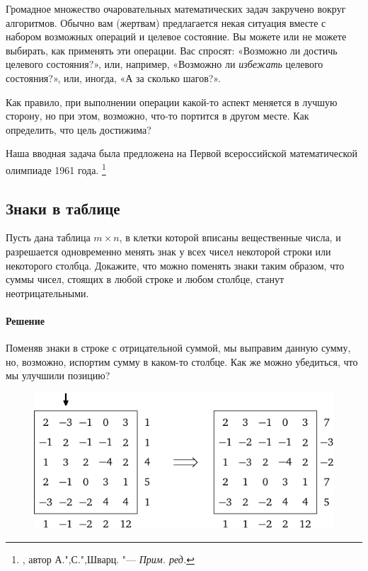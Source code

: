 \documentclass[twoside]{book}
\makeatletter
\newcommand{\rindex}[2][\imki@jobname]{%
  \index[#1]{\detokenize{#2}}%
}
\makeatother
\begin{document}

Громадное множество очаровательных математических задач закручено вокруг алгоритмов.
Обычно вам (жертвам) %
предлагается некая ситуация вместе с набором возможных операций и целевое состояние.
Вы можете или не можете выбирать, как применять эти операции.
Вас спросят: «Возможно ли достичь целевого состояния?», или, например, «Возможно ли \emph{избежать} целевого состояния?», или, иногда, «А за сколько шагов?».

Как правило, при выполнении операции какой-то аспект меняется в лучшую сторону, но при этом, возможно, что-то портится в другом месте.
Как определить, что цель достижима?

Наша вводная задача была предложена на Первой всероссийской математической олимпиаде 1961 года.%
\footnote{ \cite[№7]{ВсМО}, автор А.",С.",Шварц. "--- \emph{Прим. ред.}}

\subsection*{Знаки в таблице}%
\rindex{Знаки в таблице}

Пусть дана таблица $m\times n$, в клетки которой вписаны вещественные числа, и разрешается одновременно менять знак у всех чисел некоторой строки или некоторого столбца.
Докажите, что можно поменять знаки таким образом, что суммы чисел, стоящих в любой строке и любом столбце, станут неотрицательными.

\paragraph{Решение}
Поменяв знаки в строке с отрицательной суммой, мы выправим данную сумму, но, возможно, испортим сумму в каком-то столбце.
Как же можно убедиться, что мы улучшили позицию?

\begin{figure}
\centering
\includegraphics{mp/wink-16}
\end{figure}
\end{document}
